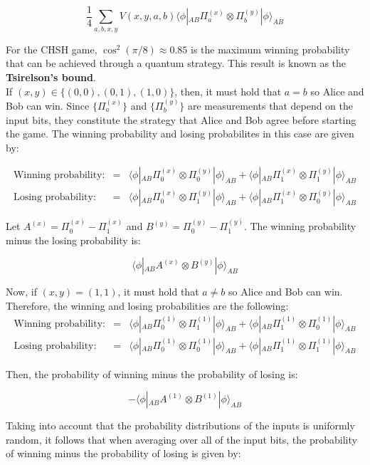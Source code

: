 \documentclass[12pt, letterpaper]{article}
\begin{document}
\[
\frac{1}{4}\sum_{a,b,x,y} V(x,y,a,b)\langle \phi |_{AB} \Pi_a^{(x)} \otimes \Pi_b^{(y)} | \phi \rangle_{AB}
\]

For the CHSH game, $\cos^2(\pi/8) \approx 0.85$ is the maximum winning probability that can be achieved through a quantum strategy. This result is known as the \textbf{Tsirelson's bound}.\\

If $(x,y) \in \{ (0,0), (0,1), (1,0) \}$, then, it must hold that $a=b$ so Alice and Bob can win. Since $\{ \Pi_a^{(x)} \}$ and $\{ \Pi_b^{(y)} \}$ are measurements that depend on the input bits, they constitute the strategy that Alice and Bob agree before starting the game. The winning probability and losing probabilites in this case are given by:

\begin{eqnarray*}
    \text{Winning probability:} &=& \langle \phi|_{AB} \Pi_0^{(x)} \otimes \Pi_0^{(y)} | \phi \rangle_{AB} + \langle \phi|_{AB} \Pi_1^{(x)} \otimes \Pi_1^{(y)} | \phi \rangle_{AB} \\
    \text{Losing probability:} &=& \langle \phi|_{AB} \Pi_0^{(x)} \otimes \Pi_1^{(y)} | \phi \rangle_{AB} + \langle \phi|_{AB} \Pi_1^{(x)} \otimes \Pi_0^{(y)} | \phi \rangle_{AB}
\end{eqnarray*}

Let $A^{(x)} = \Pi_0^{(x)} - \Pi_1^{(x)}$ and $B^{(y)} = \Pi_0^{(y)} - \Pi_1^{(y)}$. The winning probability minus the losing probability is:

\[
\langle \phi|_{AB} A^{(x)} \otimes B^{(y)} | \phi \rangle_{AB}
\]

Now, if $(x,y) = (1,1)$, it must hold that $a\neq b$ so Alice and Bob can win. Therefore, the winning and losing probabilities are the following:
\begin{eqnarray*}
    \text{Winning probability:} &=& \langle \phi|_{AB} \Pi_0^{(1)} \otimes \Pi_1^{(1)} | \phi \rangle_{AB} + \langle \phi|_{AB} \Pi_1^{(1)} \otimes \Pi_0^{(1)} | \phi \rangle_{AB} \\
    \text{Losing probability:} &=& \langle \phi|_{AB} \Pi_0^{(1)} \otimes \Pi_0^{(1)} | \phi \rangle_{AB} + \langle \phi|_{AB} \Pi_1^{(1)} \otimes \Pi_1^{(1)} | \phi \rangle_{AB}
\end{eqnarray*}

Then, the probability of winning minus the probability of losing is:

\[
-\langle \phi|_{AB} A^{(1)} \otimes B^{(1)} | \phi \rangle_{AB}
\]

Taking into account that the probability distributions of the inputs is uniformly random, it follows that when averaging over all of the input bits, the probability of winning minus the probability of losing is given by:
\end{document}
